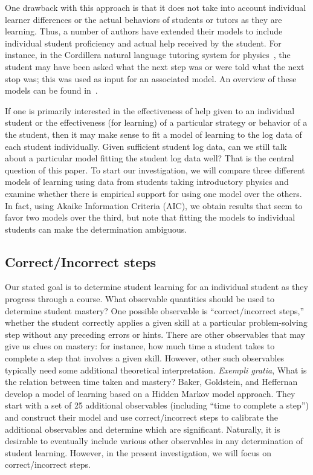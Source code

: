 \documentclass{edm_template}
\begin{document}
One drawback with this approach is that it does not take into account
individual learner differences or the actual behaviors of students or
tutors as they are learning.  Thus, a number of authors have extended
their models to include individual student proficiency and actual help
received by the student.  For instance, in the Cordillera natural
language tutoring system for physics~\cite{vanlehn_developing_2007},
the student may have been asked what the next step was or were told
what the next stop was; this was used as input for an associated
model.  An overview of these models can be found 
in~\cite{chi_instructional_2011}.

If one is primarily interested in the effectiveness of help given to
an individual student or the effectiveness (for learning) of a particular
strategy or behavior of a the student, then it may make sense
to fit a model of learning to the log data of each student individually.
Given sufficient student log data, can we still talk about a particular
model fitting the student log data well?  That is the central question
of this paper.
To start our investigation, we will compare three different models of
learning using data from students taking introductory physics and examine
whether there is empirical support for using one model over the
others.  In fact, using Akaike Information Criteria (AIC), we obtain
results that seem to favor two models over the third, but note
that fitting the models to individual students can make the determination ambiguous.


\subsection{Correct/Incorrect steps}

Our stated goal is to determine student learning for an individual
student as they progress through a course.  What observable quantities
should be used to determine student mastery?  One possible observable
is ``correct/incorrect steps,'' whether the student correctly applies
a given skill at a particular problem-solving step without any
preceding errors or hints.  There are other observables that may give
us clues on mastery: for instance, how much time a student takes to
complete a step that involves a given skill.  However, other such
observables typically need some additional theoretical
interpretation. {\em Exempli gratia}, What is the relation between
time taken and mastery?  Baker, Goldstein, and
Heffernan~\citeyear{baker_detecting_2011} develop a model of learning
based on a Hidden Markov model approach.  They start with a set of
25 additional observables (including ``time to complete a step'') and
construct their model and use correct/incorrect steps
to calibrate the additional observables and determine which are
significant.  Naturally, it is
desirable to eventually include various other observables in any
determination of student learning.  However, in the present investigation,
we will focus on correct/incorrect steps.
\end{document}
